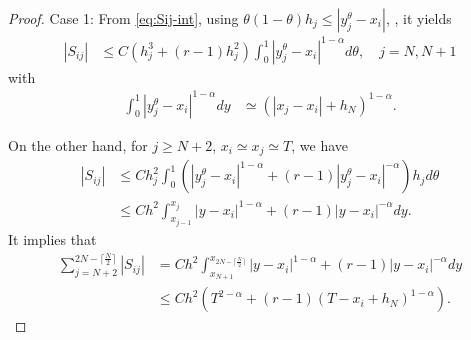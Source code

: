 \documentclass{amsart}
\theoremstyle{definition}
\theoremstyle{remark}
\numberwithin{equation}{section}
\begin{document}
\begin{proof}

  Case 1: From \eqref{eq:Sij-int}, using \(\theta(1-\theta) h_j \le |y_j^\theta - x_i|\), , it yields
  \begin{equation*}
    \begin{aligned}
      |S_{ij}| &\le C (h_j^3 + (r-1)h_j^2) \int_{0}^1 |y_j^\theta - x_i|^{1-\alpha} d\theta , \quad j=N, N+1
    \end{aligned}
  \end{equation*}
  with 
  \begin{equation*}
    \begin{aligned}
      \int_{0}^{1} |y_j^\theta - x_i|^{1-\alpha} dy 
      &\simeq (|x_j - x_i| + h_N)^{1-\alpha} .
    \end{aligned}
  \end{equation*}

  On the other hand, for $j\ge N+2$, $x_i \simeq x_j \simeq T$, we have
  \begin{equation*}
    \begin{aligned}
      |S_{ij}| &\le C h_j^2 \int_{0}^1 \left(|y_j^\theta - x_i|^{1-\alpha}+ (r-1)|y_j^\theta - x_i|^{-\alpha}\right) h_j d\theta  \\
      &\le C h^2 \int_{x_{j-1}}^{x_{j}} |y - x_i|^{1-\alpha} + (r-1)|y - x_i|^{-\alpha} dy .
    \end{aligned}
  \end{equation*}
  It implies that
  \begin{equation*}
    \begin{aligned}
      \sum_{j=N+2}^{2N-\lceil\frac{N}{2}\rceil} |S_{ij}| 
      &= C h^2 \int_{x_{N+1}}^{x_{2N-\lceil\frac{N}{2}\rceil}} |y - x_i|^{1-\alpha} + (r-1)|y - x_i|^{-\alpha} dy \\
      & \le C h^2 \left( T^{2-\alpha} + (r-1) (T-x_i + h_N)^{1-\alpha} \right)  .
    \end{aligned}
  \end{equation*}
  

\end{proof}
\end{document}
